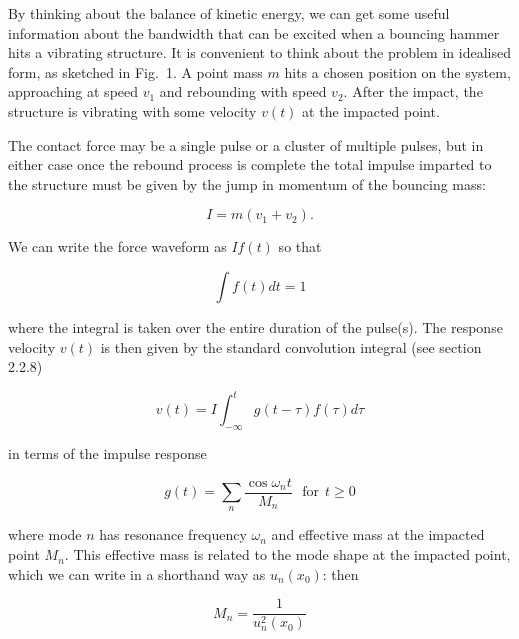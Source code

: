   By thinking about the balance of kinetic energy, we can get some useful 
  information about the bandwidth that can be excited when a bouncing hammer 
  hits a vibrating structure. It is convenient to think about the problem in 
  idealised form, as sketched in Fig.\ 1. A point mass $m$ hits a chosen 
  position on the system, approaching at speed $v_1$ and rebounding with speed 
  $v_2$. After the impact, the structure is vibrating with some velocity $v(t)$ 
  at the impacted point. 


  The contact force may be a single pulse or a cluster of multiple pulses, but 
  in either case once the rebound process is complete the total impulse 
  imparted to the structure must be given by the jump in momentum of the 
  bouncing mass: 

  \begin{equation*}I=m(v_1+v_2). \tag{1}\end{equation*} 

  We can write the force waveform as $I f(t)$ so that 

  \begin{equation*}\int{f(t) dt} = 1 \tag{2}\end{equation*} 

  \noindent{}where the integral is taken over the entire duration of the 
  pulse(s). The response velocity $v(t)$ is then given by the standard 
  convolution integral (see section 2.2.8) 

  \begin{equation*}v(t)=I \int_{-\infty}^t{g(t-\tau) f(\tau) d \tau} 
  \tag{3}\end{equation*} 

  \noindent{}in terms of the impulse response 

  \begin{equation*}g(t) = \sum_n{\dfrac{\cos \omega_n t}{M_n}} 
  \mathrm{~~~for~~} t\ge 0 \tag{4}\end{equation*} 

  \noindent{}where mode $n$ has resonance frequency $\omega_n$ and effective 
  mass at the impacted point $M_n$. This effective mass is related to the mode 
  shape at the impacted point, which we can write in a shorthand way as 
  $u_n(x_0)$: then 

  \begin{equation*}M_n=\dfrac{1}{u_n^2(x_0)} \tag{5}\end{equation*} 

